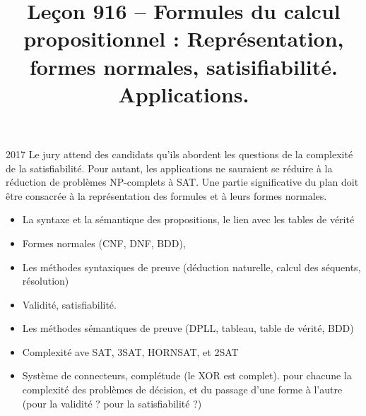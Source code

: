 \documentclass{agregfiche}
\title{Leçon 916 -- Formules du calcul propositionnel : Représentation, formes
normales, satisifiabilité. Applications.}
\begin{document}
\maketitle

\secrapports

\begin{rapport}{2017}
    Le jury attend des candidats qu'ils abordent les questions de la complexité de la satisfiabilité. Pour autant, les applications ne sauraient se réduire à la réduction de problèmes NP-complets à SAT. Une partie significative du plan doit être consacrée à la représentation des formules et à leurs formes normales.
\end{rapport}

\secindispensables

\begin{itemize}
    \item La syntaxe et la sémantique des propositions,
        le lien avec les tables de vérité
   	\item Formes normales (CNF, DNF, BDD),
    \item Les méthodes syntaxiques de preuve (déduction naturelle,
        calcul des séquents, résolution)
    \item Validité, satisfiabilité.

\end{itemize}

\secasavoir

\begin{itemize}
    \item Les méthodes sémantiques de preuve (DPLL, tableau, 
table de vérité, BDD)
	\item Complexité ave SAT, 3SAT, HORNSAT, et 2SAT
	\item Système de connecteurs, complétude (le XOR est complet).
	pour chacune la complexité des problèmes de décision, 
	et du passage d'une forme à l'autre (pour la validité ? pour la
	satisfiabilité ?)
\end{itemize}


\secidees
\end{document}
